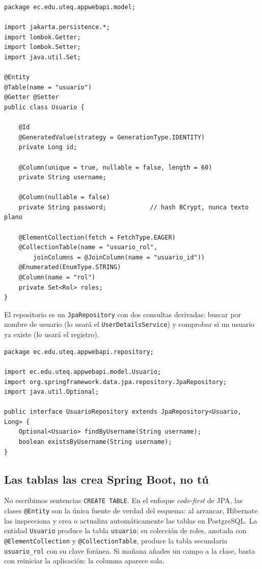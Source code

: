 \documentclass[11pt]{article}
\begin{document}
\begin{cajacodigo}
\begin{lstlisting}[style=java]
package ec.edu.uteq.appwebapi.model;

import jakarta.persistence.*;
import lombok.Getter;
import lombok.Setter;
import java.util.Set;

@Entity
@Table(name = "usuario")
@Getter @Setter
public class Usuario {

    @Id
    @GeneratedValue(strategy = GenerationType.IDENTITY)
    private Long id;

    @Column(unique = true, nullable = false, length = 60)
    private String username;

    @Column(nullable = false)
    private String password;            // hash BCrypt, nunca texto plano

    @ElementCollection(fetch = FetchType.EAGER)
    @CollectionTable(name = "usuario_rol",
        joinColumns = @JoinColumn(name = "usuario_id"))
    @Enumerated(EnumType.STRING)
    @Column(name = "rol")
    private Set<Rol> roles;
}
\end{lstlisting}
\end{cajacodigo}

El repositorio es un \texttt{JpaRepository} con dos consultas derivadas: buscar por nombre de usuario (lo usará el \texttt{UserDetailsService}) y comprobar si un usuario ya existe (lo usará el registro).

\begin{cajacodigo}
\begin{lstlisting}[style=java]
package ec.edu.uteq.appwebapi.repository;

import ec.edu.uteq.appwebapi.model.Usuario;
import org.springframework.data.jpa.repository.JpaRepository;
import java.util.Optional;

public interface UsuarioRepository extends JpaRepository<Usuario, Long> {
    Optional<Usuario> findByUsername(String username);
    boolean existsByUsername(String username);
}
\end{lstlisting}
\end{cajacodigo}

\subsection{Las tablas las crea Spring Boot, no tú}
No escribimos sentencias \texttt{CREATE TABLE}. En el enfoque \emph{code-first} de JPA, las clases \texttt{@Entity} son la única fuente de verdad del esquema: al arrancar, Hibernate las inspecciona y crea o actualiza automáticamente las tablas en PostgreSQL. La entidad \texttt{Usuario} produce la tabla \texttt{usuario}; su colección de roles, anotada con \texttt{@ElementCollection} y \texttt{@CollectionTable}, produce la tabla secundaria \texttt{usuario\_rol} con su clave foránea. Si mañana añades un campo a la clase, basta con reiniciar la aplicación: la columna aparece sola.
\end{document}
